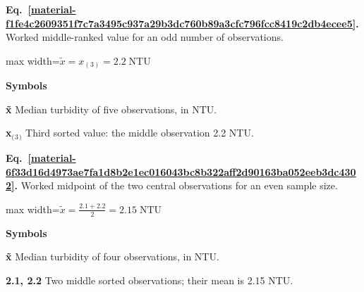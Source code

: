 \documentclass[11pt,a4paper]{article}
\begin{document}
\par\medskip
\begin{samepage}
\label{material-f1fe4c2609351f7c7a3495c937a29b3dc760b89a3cfc796fcc8419c2db4ecee5}
\noindent\textbf{Eq.~\ref*{material-f1fe4c2609351f7c7a3495c937a29b3dc760b89a3cfc796fcc8419c2db4ecee5}.} Worked middle-ranked value for an odd number of observations.\par\nopagebreak
\begin{center}\begin{adjustbox}{max width=\linewidth}$\displaystyle \tilde{x}=x_{(3)}=2.2\;\mathrm{NTU}$\end{adjustbox}\end{center}

\par\noindent\textbf{Symbols}

\par\noindent\textbf{x̃} Median turbidity of five observations, in NTU.

\par\noindent\textbf{x\ensuremath{{}_{(}}\ensuremath{{}_3}\ensuremath{{}_{)}}} Third sorted value: the middle observation 2.2 NTU.

\end{samepage}
\medskip

\par\medskip
\begin{samepage}
\label{material-6f33d16d4973ae7fa1d8b2e1ec016043bc8b322aff2d90163ba052eeb3dc4302}
\noindent\textbf{Eq.~\ref*{material-6f33d16d4973ae7fa1d8b2e1ec016043bc8b322aff2d90163ba052eeb3dc4302}.} Worked midpoint of the two central observations for an even sample size.\par\nopagebreak
\begin{center}\begin{adjustbox}{max width=\linewidth}$\displaystyle \tilde{x}=\frac{2.1+2.2}{2}=2.15\;\mathrm{NTU}$\end{adjustbox}\end{center}

\par\noindent\textbf{Symbols}

\par\noindent\textbf{x̃} Median turbidity of four observations, in NTU.

\par\noindent\textbf{2.1, 2.2} Two middle sorted observations; their mean is 2.15 NTU.

\end{samepage}
\medskip
\end{document}
